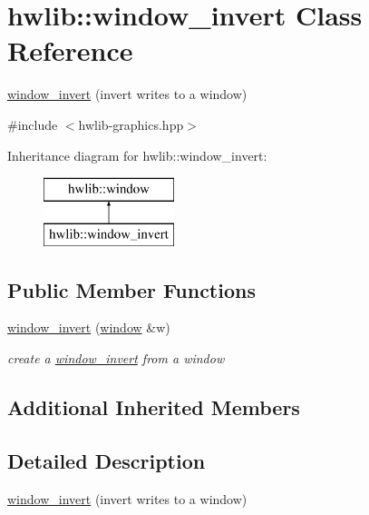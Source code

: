 \hypertarget{classhwlib_1_1window__invert}{}\section{hwlib\+:\+:window\+\_\+invert Class Reference}
\label{classhwlib_1_1window__invert}


\hyperlink{classhwlib_1_1window__invert}{window\+\_\+invert} (invert writes to a window)  




{\ttfamily \#include $<$hwlib-\/graphics.\+hpp$>$}

Inheritance diagram for hwlib\+:\+:window\+\_\+invert\+:\begin{figure}[H]
\begin{center}
\leavevmode
\includegraphics[height=2.000000cm]{classhwlib_1_1window__invert}
\end{center}
\end{figure}
\subsection*{Public Member Functions}
\begin{DoxyCompactItemize}
\item 
\hyperlink{classhwlib_1_1window__invert_a2ee672d63f206e7e90558783f071d98a}{window\+\_\+invert} (\hyperlink{classhwlib_1_1window}{window} \&w)
\begin{DoxyCompactList}\small\item\em create a \hyperlink{classhwlib_1_1window__invert}{window\+\_\+invert} from a window \end{DoxyCompactList}\end{DoxyCompactItemize}
\subsection*{Additional Inherited Members}


\subsection{Detailed Description}
\hyperlink{classhwlib_1_1window__invert}{window\+\_\+invert} (invert writes to a window) 


